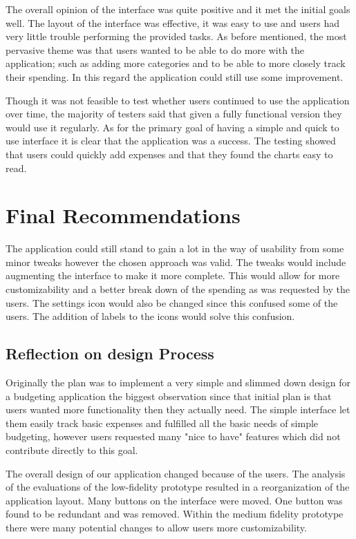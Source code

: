 \documentclass{chi2011}
\begin{document}
    The overall opinion of the interface was quite positive and it met the
    initial goals well. The layout of the interface was effective, it was easy
    to use and users had very little trouble performing the provided tasks. As
    before mentioned, the most pervasive theme was that users wanted to be able
    to do more with the application; such as adding more categories and to be
    able to more closely track their spending. In this regard the application
    could still use some improvement. 
    
    Though it was not feasible to test whether users continued to use the
    application over time, the majority of testers said that given a fully
    functional version they would use it regularly. As for the primary goal of
    having a simple and quick to use interface it is clear that the application
    was a success. The testing showed that users could quickly add expenses and
    that they found the charts easy to read.

\section{Final Recommendations}
	
The application could still stand to gain a lot in the way of usability from
some minor tweaks however the chosen approach was valid. The tweaks would
include augmenting the interface to make it more complete. This would allow for
more customizability and a better break down of the spending as was requested
by the users. The settings icon would also be changed since this confused some of the
users. The addition of labels to the icons would solve this confusion.

\subsection{Reflection on design Process}

Originally the plan was to implement a very simple and slimmed down design
for a budgeting application the biggest observation since that initial plan
is that users wanted more functionality then they actually need. The simple
interface let them easily track basic expenses and fulfilled all the basic
needs of simple budgeting, however users requested many "nice to have" features
which did not contribute directly to this goal.

The overall design of our application changed because of the users. The analysis
of the evaluations of the low-fidelity prototype resulted in a reorganization of the
application layout. Many buttons on the interface were moved. One button
was found to be redundant and was removed. Within the medium fidelity
prototype there were many potential changes to allow users more
customizability.
\end{document}
